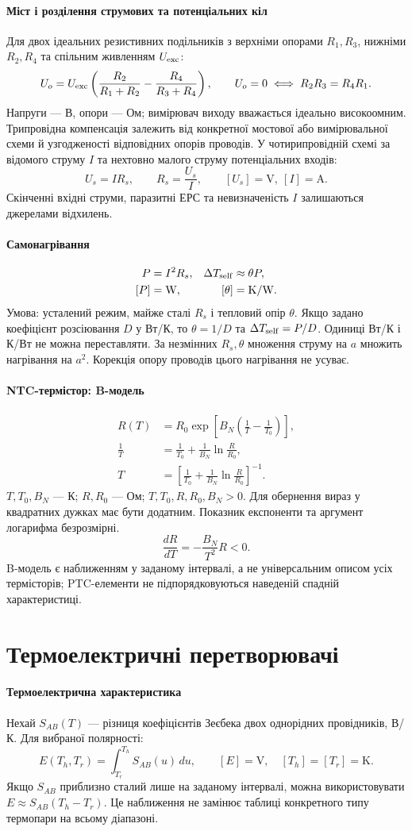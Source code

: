 \documentclass[11pt,a4paper]{article}
\newcommand{\K}{\mathrm{K}}
\newcommand{\defn}[1]{\paragraph{#1}}
\begin{document}
\defn{Міст і розділення струмових та потенціальних кіл}
Для двох ідеальних резистивних подільників з верхніми опорами $R_1,R_3$,
нижніми $R_2,R_4$ та спільним живленням $U_{\rm exc}$:
\[
 U_o=U_{\rm exc}\left(\frac{R_2}{R_1+R_2}-\frac{R_4}{R_3+R_4}\right),
 \qquad U_o=0\iff R_2R_3=R_4R_1.
\]
Напруги --- В, опори --- Ом; вимірювач виходу вважається ідеально високоомним.
Трипровідна компенсація залежить від конкретної мостової або вимірювальної схеми й узгодженості відповідних опорів проводів.
У чотирипровідній схемі за відомого струму $I$ та нехтовно малого струму потенціальних входів:
\[
 U_s=IR_s,\qquad R_s=\frac{U_s}{I},\qquad [U_s]=\mathrm V,\ [I]=\mathrm A.
\]
Скінченні вхідні струми, паразитні ЕРС та невизначеність $I$ залишаються джерелами відхилень.

\defn{Самонагрівання}
\begin{align}
 P&=I^2R_s, & \Delta T_{\rm self}&\approx\theta P,\\
 [P]&=\mathrm W, & [\theta]&=\K/\mathrm W.
\end{align}
Умова: усталений режим, майже сталі $R_s$ і тепловий опір $\theta$.
Якщо задано коефіцієнт розсіювання $D$ у Вт/К, то $\theta=1/D$ та
$\Delta T_{\rm self}=P/D$. Одиниці Вт/К і К/Вт не можна переставляти.
За незмінних $R_s,\theta$ множення струму на $a$ множить нагрівання на $a^2$.
Корекція опору проводів цього нагрівання не усуває.

\defn{NTC-термістор: B-модель}
\begin{align}
 R(T)&=R_0\exp\left[B_N\left(\frac1T-\frac1{T_0}\right)\right],\\
 \frac1T&=\frac1{T_0}+\frac1{B_N}\ln\frac{R}{R_0},\\
 T&=\left[\frac1{T_0}+\frac1{B_N}\ln\frac{R}{R_0}\right]^{-1}.
\end{align}
$T,T_0,B_N$ --- К; $R,R_0$ --- Ом; $T,T_0,R,R_0,B_N>0$.
Для обернення вираз у квадратних дужках має бути додатним.
Показник експоненти та аргумент логарифма безрозмірні.
\[
 \frac{dR}{dT}=-\frac{B_N}{T^2}R<0.
\]
B-модель є наближенням у заданому інтервалі, а не універсальним описом усіх термісторів; PTC-елементи не підпорядковуються наведеній спадній характеристиці.

\section{Термоелектричні перетворювачі}

\defn{Термоелектрична характеристика}
Нехай $S_{AB}(T)$ --- різниця коефіцієнтів Зеєбека двох однорідних провідників, В/К.
Для вибраної полярності:
\[
 E(T_h,T_r)=\int_{T_r}^{T_h}S_{AB}(u)\,du,
 \qquad [E]=\mathrm V,\quad [T_h]=[T_r]=\K.
\]
Якщо $S_{AB}$ приблизно сталий лише на заданому інтервалі, можна використовувати $E\approx S_{AB}(T_h-T_r)$.
Це наближення не замінює таблиці конкретного типу термопари на всьому діапазоні.
\end{document}
